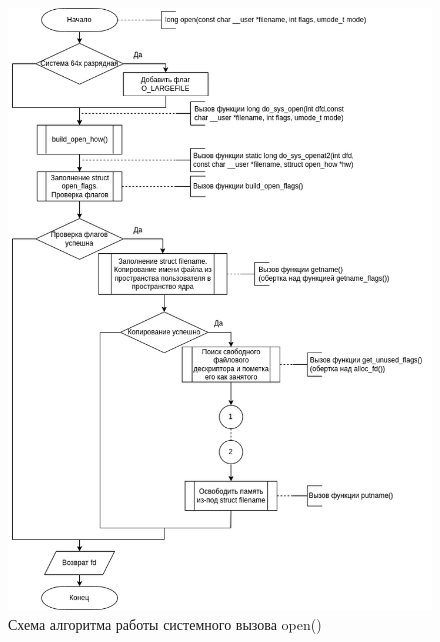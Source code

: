\documentclass[14pt,a4paper]{scrreprt}
\begin{document}
\begin{figure}[H]
	\begin{center}
		\includegraphics[scale=0.58]{assets/open-1.png}
	\end{center}
	\caption{Схема алгоритма работы системного вызова open()}
\end{figure}
\end{document}
